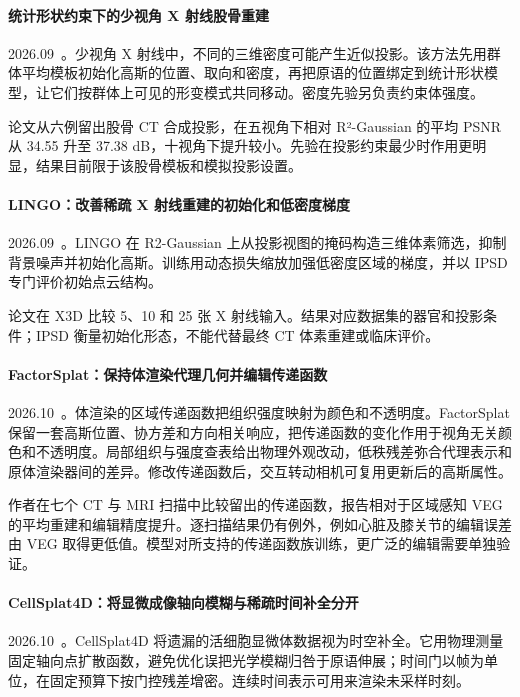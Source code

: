 \paragraph{统计形状约束下的少视角 X 射线股骨重建}
2026.09~\cite{2609_10376}。少视角 X 射线中，不同的三维密度可能产生近似投影。该方法先用群体平均模板初始化高斯的位置、取向和密度，再把原语的位置绑定到统计形状模型，让它们按群体上可见的形变模式共同移动。密度先验另负责约束体强度。

论文从六例留出股骨 CT 合成投影，在五视角下相对 R²-Gaussian 的平均 PSNR 从 34.55 升至 37.38 dB，十视角下提升较小。先验在投影约束最少时作用更明显，结果目前限于该股骨模板和模拟投影设置。

\paragraph{LINGO：改善稀疏 X 射线重建的初始化和低密度梯度}
2026.09~\cite{2609_22849}。LINGO 在 R2-Gaussian 上从投影视图的掩码构造三维体素筛选，抑制背景噪声并初始化高斯。训练用动态损失缩放加强低密度区域的梯度，并以 IPSD 专门评价初始点云结构。

论文在 X3D 比较 5、10 和 25 张 X 射线输入。结果对应数据集的器官和投影条件；IPSD 衡量初始化形态，不能代替最终 CT 体素重建或临床评价。

\paragraph{FactorSplat：保持体渲染代理几何并编辑传递函数}
2026.10~\cite{2610_02382}。体渲染的区域传递函数把组织强度映射为颜色和不透明度。FactorSplat 保留一套高斯位置、协方差和方向相关响应，把传递函数的变化作用于视角无关颜色和不透明度。局部组织与强度查表给出物理外观改动，低秩残差弥合代理表示和原体渲染器间的差异。修改传递函数后，交互转动相机可复用更新后的高斯属性。

作者在七个 CT 与 MRI 扫描中比较留出的传递函数，报告相对于区域感知 VEG 的平均重建和编辑精度提升。逐扫描结果仍有例外，例如心脏及膝关节的编辑误差由 VEG 取得更低值。模型对所支持的传递函数族训练，更广泛的编辑需要单独验证。

\paragraph{CellSplat4D：将显微成像轴向模糊与稀疏时间补全分开}
2026.10~\cite{2610_04199}。CellSplat4D 将遗漏的活细胞显微体数据视为时空补全。它用物理测量固定轴向点扩散函数，避免优化误把光学模糊归咎于原语伸展；时间门以帧为单位，在固定预算下按门控残差增密。连续时间表示可用来渲染未采样时刻。

